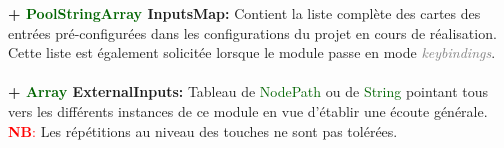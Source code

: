 \documentclass[a4paper, 11pt]{article}
\begin{document}
	\textbf{+ \textcolor{darkgreen}{PoolStringArray} InputsMap:} Contient la liste complète des cartes des
	entrées pré-configurées dans les configurations du projet en cours de réalisation. Cette liste est 
	également solicitée lorsque le module passe en mode \textit{\textcolor{gray}{keybindings}}.\\\\
	\textbf{+ \textcolor{darkgreen}{Array} \hypertarget{extinp}{ExternalInputs}:} Tableau de
	\textcolor{darkgreen}{NodePath} ou de \textcolor{darkgreen}{String} pointant tous vers les différents 
	instances de ce module en vue d'établir une écoute générale.\\
	\textcolor{red}{\textbf{NB}:} Les répétitions au niveau des touches ne sont pas tolérées.

\end{document}
